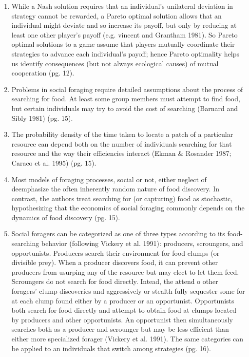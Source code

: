 \documentclass[a4paper,11pt]{article}
\begin{document}
\begin{enumerate}
\item While a Nash solution requires that an individual's unilateral deviation in strategy cannot be rewarded, a Pareto optimal solution allows that an individual might deviate and so increase its payoff, but only by reducing at least one other player's payoff (e.g. vincent and Grantham 1981). So Pareto optimal solutions to a game assume that players mutually coordinate their strategies to advance each individual's payoff; hence Pareto optimality helps us identify consequences (but not always ecological causes) of mutual cooperation (pg. 12). 
\item Problems in social foraging require detailed assumptions about the process of searching for food. At least some group members must attempt to find food, but certain individuals may try to avoid the cost of searching (Barnard and Sibly 1981) (pg. 15). 
\item The probability density of the time taken to locate a patch of a particular resource can depend both on the number of individuals searching for that resource and the way their efficiencies interact (Ekman \& Rosander 1987; Caraco et al. 1995) (pg. 15).
\item Most models of foraging processes, social or not, either neglect of deemphasize the often inherently random nature of food discovery. In contrast, the authors treat searching for (or capturing) food as stochastic, hypothesizing that the economics of social foraging commonly depends on the dynamics of food discovery (pg. 15). 
\item Social foragers can be categorized as one of three types according to its food-searching behavior (following Vickery et al. 1991): producers, scroungers, and opportunists. Producers search their environment for food clumps (or divisible prey). When a producer discovers food, it can prevent other producers from usurping any of the resource but may elect to let them feed. Scroungers do not search for food directly. Intead, the attend o other foragers' clump discoveries and aggressively or stealth fully sequester some for at each clump found either by a producer or an opportunist. Opportunists both search for food directly and attempt to obtain food at clumps located by producers and other opportunists. An opportunist  then simultaneously searches both as a producer and scrounger but may be less efficient than either more specialized forager (Vickery et al. 1991). The same categories can be applied to an individuals that switch among strategies (pg. 16). 
\begin{description}

\end{description}
\end{enumerate}
\end{document}
